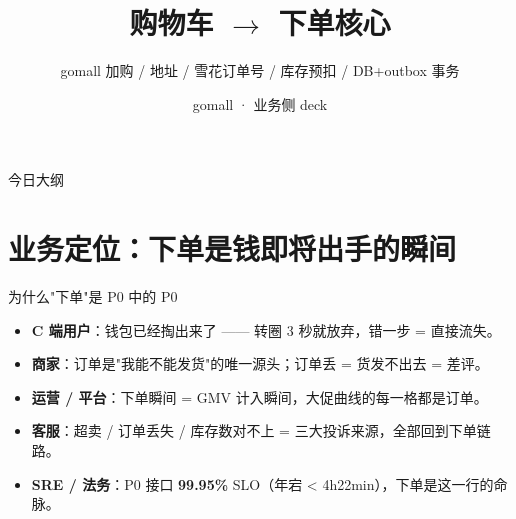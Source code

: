 \documentclass[aspectratio=169,11pt]{beamer}
\title{购物车 $\to$ 下单核心}
\subtitle{gomall 加购 / 地址 / 雪花订单号 / 库存预扣 / DB+outbox 事务}
\author{gomall · 业务侧 deck}
\date{}
\begin{document}
\maketitle

\begin{frame}[shrink]{今日大纲}
\tableofcontents
\end{frame}

\section{业务定位：下单是\textbf{钱即将出手}的瞬间}

\begin{frame}[shrink]{为什么"下单"是 P0 中的 P0}
\begin{itemize}
  \item \textbf{C 端用户}：钱包已经掏出来了 —— 转圈 3 秒就放弃，错一步 = 直接流失。
  \item \textbf{商家}：订单是"我能不能发货"的唯一源头；订单丢 = 货发不出去 = 差评。
  \item \textbf{运营 / 平台}：下单瞬间 = GMV 计入瞬间，大促曲线的每一格都是订单。
  \item \textbf{客服}：超卖 / 订单丢失 / 库存数对不上 = 三大投诉来源，全部回到下单链路。
  \item \textbf{SRE / 法务}：P0 接口 \textbf{99.95\%} SLO（年宕 < 4h22min），下单是这一行的命脉。
\end{itemize}
\vspace{2mm}
\end{frame}
\end{document}
